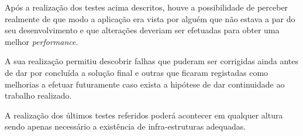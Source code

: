 	Após a realização dos testes acima descritos, houve a possibilidade de perceber realmente de que modo a aplicação era vista por alguém que não estava a par do seu desenvolvimento e que alterações deveriam ser efetuadas para obter uma melhor \textit{performance}.

	A sua realização permitiu descobrir falhas que puderam ser corrigidas ainda antes de dar por concluída a solução final e outras que ficaram registadas como melhorias a efetuar futuramente caso exista a hipótese de dar continuidade ao trabalho realizado.

	A realização dos últimos testes referidos poderá acontecer em qualquer altura sendo apenas necessário a existência de infra-estruturas adequadas.



	

